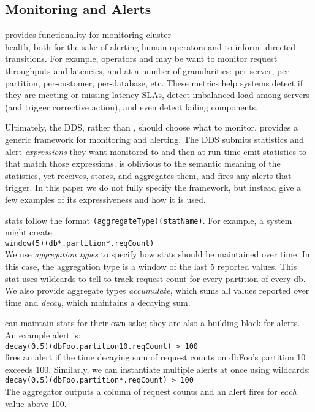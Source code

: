 \subsection{Monitoring and Alerts}
\label{alerts}
%
\helix provides functionality for monitoring cluster \\ health, both for the sake
of alerting human operators and to inform \helix-directed transitions.  
For example, operators and \helix may be want to monitor request throughputs and 
latencies, and at a number of granularities: per-server, per-partition, 
per-customer, per-database, etc.  These metrics help systems detect if they are 
meeting or missing latency SLAs, detect imbalanced load among servers 
(and trigger corrective action), and even detect failing components.  

Ultimately, the DDS, rather than \helix, should choose what to monitor.  \helix
provides a generic framework for monitoring and alerting.  The DDS submits
statistics and alert \emph{expressions} they want monitored to \helix and then
at run-time emit statistics to \helix that match those expressions.  \helix is
oblivious to the semantic meaning of the statistics, yet receives, stores, and
aggregates them, and fires any alerts that trigger.  In this paper we do not
fully specify the framework, but instead give a few examples of its
expressiveness and how it is used.

\helix stats follow the format
\texttt{(aggregateType)(statName)}.
For example, a system might create \\
\texttt{window(5)(db*.partition*.reqCount)} \\
We use \emph{aggregation types} to specify how stats should be maintained over time.  
In this case, the aggregation type is a window of the last 5 reported values.
This stat uses wildcards to tell \helix to track request count for every partition of 
every db.  We also provide aggregate types \emph{accumulate}, which sums all values 
reported over time and \emph{decay}, which maintains a decaying sum.

\helix can maintain stats for their own sake; they are also a building block for
alerts.  An example alert is: \\
\texttt{decay(0.5)(dbFoo.partition10.reqCount) > 100} \\
\helix fires an alert if the time decaying sum of request counts on 
dbFoo's partition 10 exceeds 100.  Similarly, we can instantiate multiple
alerts at once using wildcards: \\
\texttt{decay(0.5)(dbFoo.partition*.reqCount) > 100} \\
The aggregator outputs a column of request counts and an alert fires 
for \emph{each} value
above 100. 


